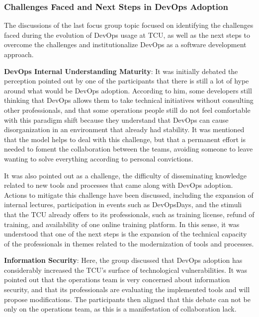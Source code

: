 \subsubsection{Challenges Faced and Next Steps in DevOps Adoption}
{
\color{blue}

The discussions of the last focus group topic focused on identifying the
challenges faced during the evolution of DevOps usage at TCU, as well as the
next steps to overcome the challenges and institutionalize DevOps as a
software development approach.

\textbf{DevOps Internal Understanding Maturity}:
It was initially debated the perception pointed out by one of the participants
that there is still a lot of hype around what would be DevOps adoption. According
to him, some developers still thinking that DevOps allows them to take technical
initiatives without consulting other professionals, and that some operations
people still do not feel comfortable with this paradigm shift because they
understand that DevOps can cause disorganization in an environment that already
had stability. It was mentioned that the model helps to deal with this challenge,
but that a permanent effort is needed to foment the collaboration between the teams,
avoiding someone to leave wanting to solve everything according to personal
convictions.

It was also pointed out as a challenge, the difficulty of disseminating
knowledge related to new tools and processes that came along with DevOps adoption.
Actions to mitigate this challenge have been discussed, including the expansion
of internal lectures, participation in events such as DevOpsDays, and the stimuli
that the TCU already offers to its professionals, such as training license, refund
of training, and availability of one online training platform. In this sense,
it was understood that one of the next steps is the expansion of the technical
capacity of the professionals in themes related to the modernization of tools
and processes.

\textbf{Information Security}:
Here, the group discussed that DevOps adoption has considerably increased the
TCU's surface of technological vulnerabilities. It was pointed out that the
operations team is very concerned about information security, and that its
professionals are evaluating the implemented tools and will propose modifications.
The participants then aligned that this debate can not be only on the operations
team, as this is a manifestation of collaboration lack.

}
